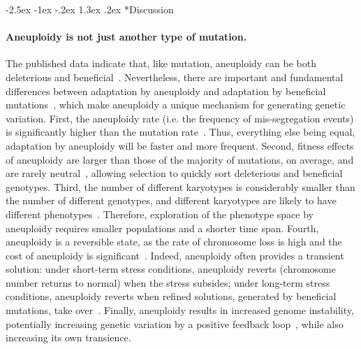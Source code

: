 \documentclass[12pt]{extarticle}
\makeatletter
\renewcommand\section{\@startsection {section}{1}{\z@}%
     {-2.5ex \@plus -1ex \@minus -.2ex}%
     {1.3ex \@plus.2ex}%
    {\Large\bfseries}}
\makeatother
\begin{document}
\pagebreak

\section*{Discussion}

\paragraph*{Aneuploidy is not just another type of mutation.}
The published data indicate that, like mutation, aneuploidy can be both deleterious and beneficial~\citep{Pavelka2010, Sheltzer2011}.
Nevertheless, there are important and fundamental differences between adaptation by aneuploidy
and adaptation by beneficial mutations~\citep{Yona2015}, which make aneuploidy a unique mechanism for generating genetic
variation.
First, the aneuploidy rate (i.e. the frequency of mis-segregation events) is significantly higher than the
mutation rate~\citep{Santaguida2015review}.
Thus, everything else being equal, adaptation by aneuploidy will be faster and more frequent.
Second, fitness effects of aneuploidy are larger than those of the majority of mutations, on average, and are rarely
neutral~\citep{Pavelka2010, Yona2012, Sunshine2015}, allowing selection to quickly sort deleterious and beneficial genotypes.
Third, the number of different karyotypes is considerably smaller than the number of different genotypes, and different karyotypes are likely to have different phenotypes~\citep{Pavelka2010}.
Therefore, exploration of the phenotype space by aneuploidy requires smaller populations and a shorter time span.
Fourth, aneuploidy is a reversible state, as the rate of chromosome loss is high and the cost of aneuploidy is significant~\citep{Niwa2006}.
Indeed, aneuploidy often provides a transient solution: under short-term stress conditions, aneuploidy reverts (chromosome number returns to normal) when the stress subsides; under long-term stress conditions, aneuploidy reverts when refined solutions, generated by beneficial mutations, take over~\citep{Yona2012}.
Finally, aneuploidy results in increased genome instability, potentially increasing genetic variation by a positive feedback loop~\citep{Rancati2013, Bouchonville2009, Zhu2012}, while also increasing its own transience.
\end{document}
